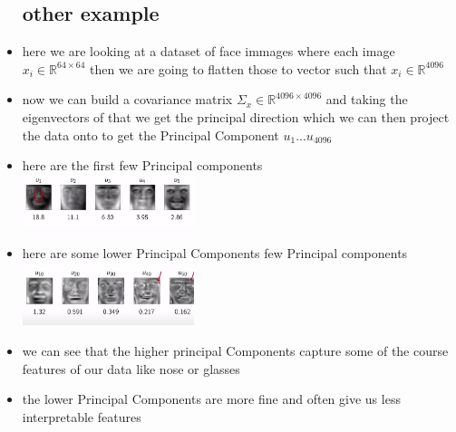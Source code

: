 \documentclass{article}
\begin{document}
\begin{itemize}
\subsection*{other example}
\item here we are looking at a dataset of face immages where each image $x_i\in \mathbb{R}^{64\times 64}$ then we are going to flatten those to vector such that $x_i\in \mathbb{R}^{4096}$
\item now we can build a covariance matrix $\Sigma_{x}\in \mathbb{R}^{4096\times 4096}$ and taking the eigenvectors of that we get the principal direction which we can then project the data onto to get the Principal Component $u_1...u_{4096}$
\item here are the first few Principal components \\ \includegraphics*[width=5cm]{notes/week_8/vedio_2/immages/v2_9.png}
\item here are some lower Principal Components few Principal components \\ \includegraphics*[width=5cm]{notes/week_8/vedio_2/immages/v2_10.png}
\item we can see that the higher principal Components capture some of the course features of our data like nose or glasses 
\item the lower Principal Components are more fine and often give us less interpretable features 
\end{itemize}
\end{document}
